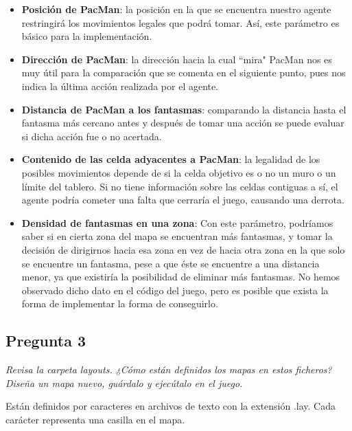\documentclass[12pt]{article}
\begin{document}
\begin{itemize}
    \item \textbf{Posición de PacMan}: la posición en la que se encuentra
    nuestro agente restringirá los movimientos legales que podrá tomar. Así,
    este parámetro es básico para la implementación.
    \item \textbf{Dirección de PacMan}: la dirección hacia la cual ``mira"
    PacMan nos es muy útil para la comparación que se comenta en el siguiente
    punto, pues nos indica la última acción realizada por el agente.
    \item \textbf{Distancia de PacMan a los fantasmas}: comparando la distancia
    hasta el fantasma más cercano antes y después de tomar una acción se puede
    evaluar si dicha acción fue o no acertada.
    \item \textbf{Contenido de las celda adyacentes a PacMan}: la legalidad de
    los posibles movimientos depende de si la celda objetivo es o no un muro o
    un límite del tablero. Si no tiene información sobre las celdas contiguas a
    sí, el agente podría cometer una falta que cerraría el juego, causando una
    derrota.
    \item \textbf{Densidad de fantasmas en una zona}: Con este parámetro,
    podríamos saber si en cierta zona del mapa se encuentran más fantasmas, y
    tomar la decisión de dirigirnos hacia esa zona en vez de hacia otra zona en
    la que solo se encuentre un fantasma, pese a que éste se encuentre a una
    distancia menor, ya que existiría la posibilidad de eliminar más fantasmas.
    No hemos observado dicho dato en el código del juego, pero es posible que
    exista la forma de implementar la forma de conseguirlo.
\end{itemize}


\newpage
\begin{center}
\subsection{Pregunta 3}

\emph{Revisa la carpeta layouts. ¿Cómo están definidos los mapas en estos
ficheros? Diseña un mapa nuevo, guárdalo y ejecútalo en el juego.}
\end{center}

Están definidos por caracteres en archivos de texto con la extensión .lay.
 Cada carácter representa una casilla en el mapa.
\end{document}
